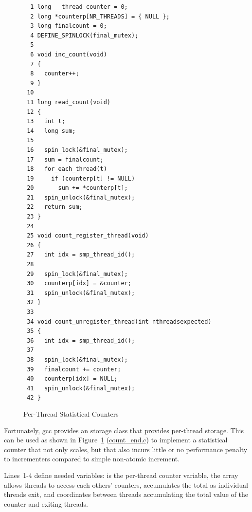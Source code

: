 \begin{figure}[tbp]
{ \scriptsize
\begin{verbatim}
  1 long __thread counter = 0;
  2 long *counterp[NR_THREADS] = { NULL };
  3 long finalcount = 0;
  4 DEFINE_SPINLOCK(final_mutex);
  5 
  6 void inc_count(void)
  7 {
  8   counter++;
  9 }
 10 
 11 long read_count(void)
 12 {
 13   int t;
 14   long sum;
 15 
 16   spin_lock(&final_mutex);
 17   sum = finalcount;
 18   for_each_thread(t)
 19     if (counterp[t] != NULL)
 20       sum += *counterp[t];
 21   spin_unlock(&final_mutex);
 22   return sum;
 23 }
 24 
 25 void count_register_thread(void)
 26 {
 27   int idx = smp_thread_id();
 28 
 29   spin_lock(&final_mutex);
 30   counterp[idx] = &counter;
 31   spin_unlock(&final_mutex);
 32 }
 33 
 34 void count_unregister_thread(int nthreadsexpected)
 35 {
 36   int idx = smp_thread_id();
 37 
 38   spin_lock(&final_mutex);
 39   finalcount += counter;
 40   counterp[idx] = NULL;
 41   spin_unlock(&final_mutex);
 42 }
\end{verbatim}
}
\caption{Per-Thread Statistical Counters}
\label{fig:count:Per-Thread Statistical Counters}
\end{figure}

Fortunately, gcc provides an  storage class that provides
per-thread storage.
This can be used as shown in
Figure~\ref{fig:count:Per-Thread Statistical Counters} (\url{count_end.c})
to implement
a statistical counter that not only scales, but that also incurs little
or no performance penalty to incrementers compared to simple non-atomic
increment.

Lines~1-4 define needed variables:  is the per-thread counter
variable, the  array allows threads to access each others'
counters,  accumulates the total as individual threads exit,
and  coordinates between threads accumulating the total
value of the counter and exiting threads.

